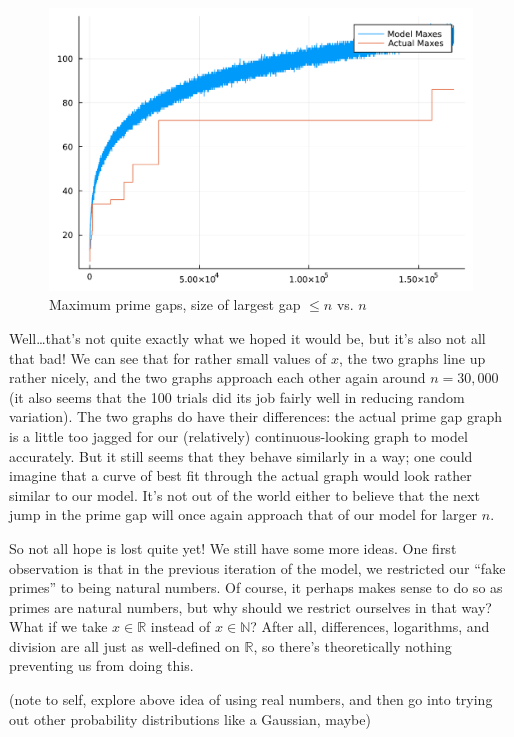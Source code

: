 \documentclass[conference]{IEEEtran}
\begin{document}
\begin{figure}[H]
  \centering
  \includegraphics[width=\linewidth,keepaspectratio]{random-plot1.pdf}
  \caption{Maximum prime gaps, size of largest gap $\le n$ vs. $n$}
\end{figure}

Well\ldots that's not quite exactly what we hoped it would be,
but it's also not all that bad! We can see that for rather
small values of $x$, the two graphs line up rather nicely,
and the two graphs approach each other again around $n = 30{,}000$
(it also seems that the 100 trials did its job fairly well in reducing
random variation). The two graphs do have their differences:
the actual prime gap graph is a little too jagged for our
(relatively) continuous-looking graph to model accurately. But it
still seems that they behave similarly in a way; one could imagine that
a curve of best fit through the actual graph would look rather similar
to our model. It's not out of the world either to believe that the next
jump in the prime gap will once again approach that of
our model for larger $n$.

So not all hope is lost quite yet! We still have some more ideas.
One first observation is that in the previous iteration of the model,
we restricted our ``fake primes'' to being natural numbers. Of course,
it perhaps makes sense to do so as primes are natural numbers, but
why should we restrict ourselves in that way? What if we take $x \in \mathbb{R}$
instead of $x \in \mathbb{N}$? After all, differences, logarithms, and
division are all just as well-defined on $\mathbb{R}$, so there's theoretically
nothing preventing us from doing this.

(note to self, explore above idea of using real numbers, and then
go into trying out other probability distributions like a Gaussian, maybe)
\end{document}
